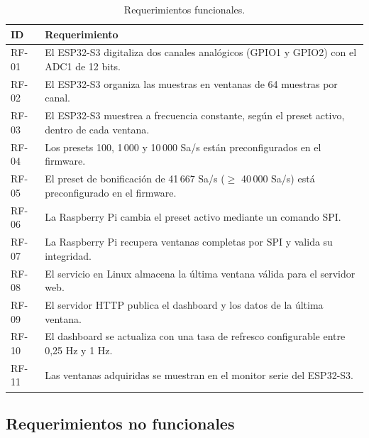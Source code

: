 \documentclass[12pt,a4paper]{article}
\begin{document}
\begin{table}[H]
\centering
\small
\begin{tabular}{@{}p{1.6cm} p{10.5cm}@{}}
\toprule
\textbf{ID} & \textbf{Requerimiento} \\
\midrule
RF-01 & El ESP32-S3 digitaliza dos canales analógicos (GPIO1 y GPIO2) con el ADC1 de 12 bits. \\
RF-02 & El ESP32-S3 organiza las muestras en ventanas de 64 muestras por canal. \\
RF-03 & El ESP32-S3 muestrea a frecuencia constante, según el preset activo, dentro de cada ventana. \\
RF-04 & Los presets 100, 1\,000 y 10\,000 Sa/s están preconfigurados en el firmware. \\
RF-05 & El preset de bonificación de 41\,667 Sa/s ($\geq$ 40\,000 Sa/s) está preconfigurado en el firmware. \\
RF-06 & La Raspberry Pi cambia el preset activo mediante un comando SPI. \\
RF-07 & La Raspberry Pi recupera ventanas completas por SPI y valida su integridad. \\
RF-08 & El servicio en Linux almacena la última ventana válida para el servidor web. \\
RF-09 & El servidor HTTP publica el dashboard y los datos de la última ventana. \\
RF-10 & El dashboard se actualiza con una tasa de refresco configurable entre 0{,}25 Hz y 1 Hz. \\
RF-11 & Las ventanas adquiridas se muestran en el monitor serie del ESP32-S3. \\
\bottomrule
\end{tabular}
\caption{Requerimientos funcionales.}
\end{table}

\subsection{Requerimientos no funcionales}
\end{document}
